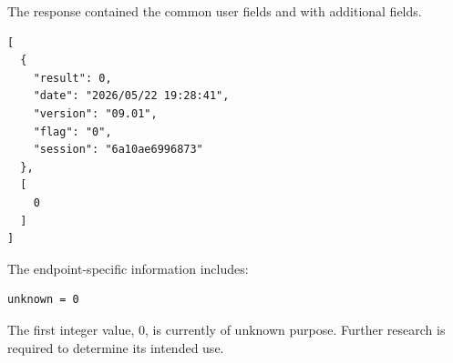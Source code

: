 The response contained the common user fields and with additional fields.

\begin{lstlisting}
[
  {
    "result": 0,
    "date": "2026/05/22 19:28:41",
    "version": "09.01",
    "flag": "0",
    "session": "6a10ae6996873"
  },
  [
    0
  ]
]
\end{lstlisting}

The endpoint-specific information includes:

\begin{lstlisting}
unknown = 0
\end{lstlisting}

\begin{tcolorbox}[colback=yellow!10,colframe=orange!80!black,title=Warning]
The first integer value, $0$, is currently of unknown purpose.
Further research is required to determine its intended use.
\end{tcolorbox}

\newpage